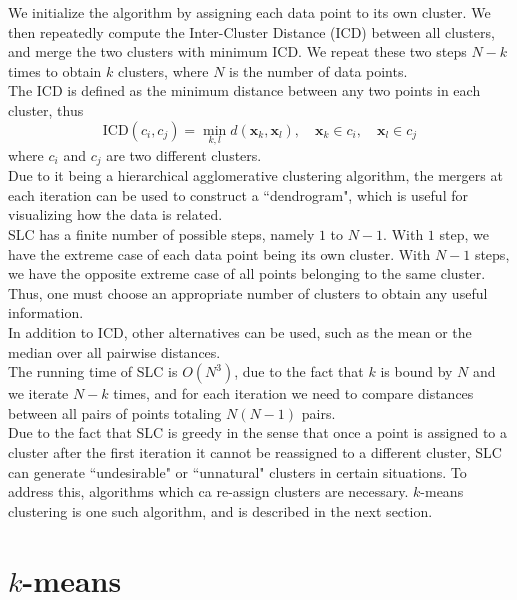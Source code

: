 \documentclass[12pt]{article}
\begin{document}
We initialize the algorithm by assigning each data point to its own cluster. We then repeatedly compute the Inter-Cluster Distance (ICD) between all clusters, and merge the two clusters with minimum ICD. We repeat these two steps $N - k$ times to obtain $k$ clusters, where $N$ is the number of data points.
\\\newline
The ICD is defined as the minimum distance between any two points in each cluster, thus
\[ \text{ICD}(c_i, c_j) = \min\limits_{k,l}d(\mathbf{x}_k, \mathbf{x}_l), \quad \mathbf{x}_k \in c_i, \quad \mathbf{x}_l \in c_j \]
where $c_i$ and $c_j$ are two different clusters.
\\\newline
Due to it being a hierarchical agglomerative clustering algorithm, the mergers at each iteration can be used to construct a ``dendrogram", which is useful for visualizing how the data is related.
\\\newline
SLC has a finite number of possible steps, namely $1$ to $N - 1$. With $1$ step, we have the extreme case of each data point being its own cluster. With $N - 1$ steps, we have the opposite extreme case of all points belonging to the same cluster. Thus, one must choose an appropriate number of clusters to obtain any useful information.
\\\newline
In addition to ICD, other alternatives can be used, such as the mean or the median over all pairwise distances.
\\\newline
The running time of SLC is $O(N^3)$, due to the fact that $k$ is bound by $N$ and we iterate $N - k$ times, and for each iteration we need to compare distances between all pairs of points totaling $N(N - 1)$ pairs.
\\\newline
Due to the fact that SLC is greedy in the sense that once a point is assigned to a cluster after the first iteration it cannot be reassigned to a different cluster, SLC can generate ``undesirable" or ``unnatural" clusters in certain situations. To address this, algorithms which ca re-assign clusters are necessary. $k$-means clustering is one such algorithm, and is described in the next section.

\section{$k$-means}
\end{document}
